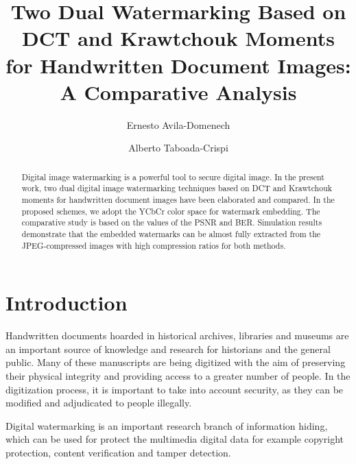 \documentclass[runningheads]{llncs}
\begin{document}
%
\title{Two Dual Watermarking Based on DCT and Krawtchouk Moments for Handwritten Document Images: A Comparative Analysis}
%
%
\author{Ernesto Avila-Domenech \and
Alberto Taboada-Crispi}
%
%
%
\maketitle              %
%
\begin{abstract}
Digital image watermarking is a powerful tool to secure digital image. In the present work, two dual digital image watermarking techniques based on DCT and Krawtchouk moments for handwritten document images have been elaborated and compared. In the proposed schemes, we adopt the YCbCr color space for watermark embedding. The comparative study is based on the values of the PSNR and BER. Simulation results demonstrate that the embedded watermarks can be almost fully extracted from the JPEG-compressed images with high compression ratios for both methods.

\end{abstract}
%
%
%
\section{Introduction}
Handwritten documents hoarded in historical archives, libraries and museums are an important source of knowledge and research for historians and the general public. Many of these manuscripts are being digitized with the aim of preserving their physical integrity and providing access to a greater number of people. In the digitization process, it is important to take into account security, as they can be modified and adjudicated to people illegally.

Digital watermarking is an important research branch of information hiding, which can be used for protect the multimedia digital data for example copyright protection, content verification and tamper detection.
\end{document}
